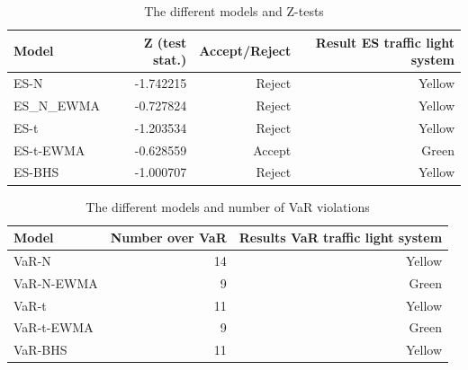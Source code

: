 \documentclass[a4paper]{article}
\begin{document}
\begin{table}[H]
    \centering
    \caption{The different models and Z-tests}
    \vspace{0.2cm}
    \begin{tabular}{lrrr}
        \toprule
                Model &  Z (test stat.) & Accept/Reject & Result ES traffic light system \\
        \midrule
                ES-N &       -1.742215 &        Reject &                         Yellow \\
            ES\_N\_EWMA &       -0.727824 &        Reject &                         Yellow \\
                ES-t &       -1.203534 &        Reject &                         Yellow \\
            ES-t-EWMA &       -0.628559 &        Accept &                          Green \\
            ES-BHS &       -1.000707 &        Reject &                         Yellow \\
        \bottomrule
    \end{tabular} 
\end{table}



\begin{table}[H]
    \centering
    \caption{The different models and number of VaR violations}
    \vspace{0.2cm}
    \begin{tabular}{lrr}
        \toprule
              Model &  Number over VaR & Results VaR traffic light system \\
        \midrule
              VaR-N &               14 &                           Yellow \\
         VaR-N-EWMA &                9 &                            Green \\
              VaR-t &               11 &                           Yellow \\
         VaR-t-EWMA &                9 &                            Green \\
            VaR-BHS &               11 &                           Yellow \\
        \bottomrule
    \end{tabular}    
\end{table}
 
\end{document}
